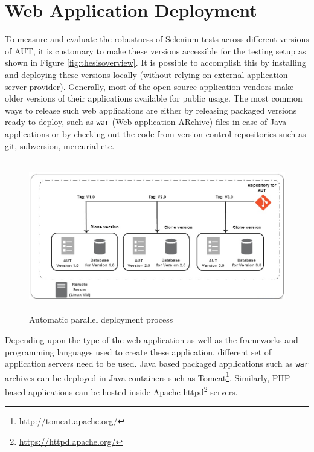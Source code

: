 \section{Web Application Deployment}
\label{sec:autoDeployment}
To measure and evaluate the robustness of Selenium tests across different versions of AUT, it is customary to make these versions accessible for the testing setup as shown in Figure \ref{fig:thesisoverview}. It is possible to accomplish this by installing and deploying these versions locally (without relying on external application server provider). Generally, most of the open-source application vendors make older versions of their applications available for public usage. The most common ways to release such web applications are either by releasing packaged versions ready to deploy, such as \texttt{war} (Web application ARchive) files in case of Java applications or by checking out the code from version control repositories such as git, subversion, mercurial etc.

\begin{figure}
\makeatletter 
\renewcommand{\thefigure}{\@arabic\c@figure}
\makeatother
    \centering
  \includegraphics[width=5.4in,height=2.6in]{./Figures/Deployment_Process_2.jpg}
  \caption{Automatic parallel deployment process}
  \label{fig:deployment} 
\end{figure}

Depending upon the type of the web application as well as the frameworks and programming languages used to create these application, different set of application servers need to be used. Java based packaged applications such as \texttt{war} archives can be deployed in Java containers such as Tomcat\footnote{\url{http://tomcat.apache.org/}}. Similarly, PHP based applications can be hosted inside Apache httpd\footnote{\url{https://httpd.apache.org/}} servers. 

